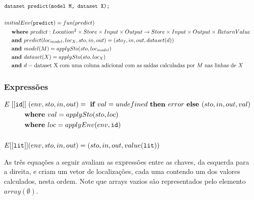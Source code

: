 \documentclass[12pt]{article}
\newcommand\eb[1]{[[\texttt{#1}]]}
\begin{document}
\begin{align*}
		&\texttt{dataset predict(model M, dataset X);} \\
	    \\
&initialEnv(\texttt{predict}) = fun(predict) \\
&\hspace{3ex}\textbf{where } predict:Location^2\times Store\times Input\times Output\rightarrow Store\times Input\times Output\times ReturnValue \\
&\hspace{3ex}\textbf{and } predict(loc_{model}, loc_{X},sto,in,out) = (sto_f,in,out,dataset(d))\\
&\hspace{3ex}\textbf{and } model(M) = applySto(sto, loc_{model}) \\
&\hspace{3ex}\textbf{and } dataset(X) = applySto(sto, loc_{X}) \\
&\hspace{3ex}\textbf{and } d = \text{dataset X com uma coluna adicional com as saídas calculadas por $M$ nas linhas de $X$}\\
\end{align*}

\subsubsection{Expressões}


\begin{align*}
&E\;\eb{id} \;(env, sto, in, out) = \text{ \bf if } val = undefined \text{ \bf then } error \text{ \bf else } (sto,in,out,val)  \\ 
&\hspace{6ex} \textbf{ where } val = applySto(sto, loc) \\
&\hspace{6ex} \textbf{ where } loc = applyEnv(env, \texttt{id}) \\
\\
&E[[{\tt lit}]] (env,sto,in,out) = (sto,in,out,value(\texttt{lit})) \\
\end{align*}

As três equações a seguir avaliam as expressões entre as chaves, da esquerda para a direita, e criam um vetor de localizações, cada uma contendo um dos valores calculados, nesta ordem. Note que arrays vazios são representados pelo elemento $array(\emptyset)$.
\end{document}
